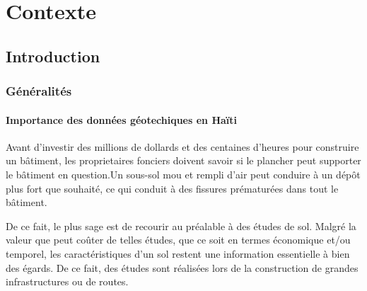 \chapter{Contexte}
\section{Introduction}
    \subsection{Généralités}
        \subsubsection{Importance des données géotechiques en Haïti}
            \par
            Avant d’investir des millions de dollards et des centaines d’heures pour 
            construire un bâtiment, les proprietaires fonciers doivent savoir si le 
            plancher peut supporter le bâtiment en question.Un sous-sol mou et 
            rempli d'air peut conduire à un dépôt plus fort que souhaité, ce qui 
            conduit à des fissures prématurées dans tout le bâtiment.
            \par
            De ce fait, le plus sage est de recourir au préalable à des études de sol.   
            Malgré la valeur que peut coûter de telles études, que ce soit en termes
            économique et/ou temporel, les caractéristiques d’un sol restent une
            information essentielle à bien des égards. De ce fait, des études sont 
            réalisées lors de la construction de grandes infrastructures ou de routes. 
  
